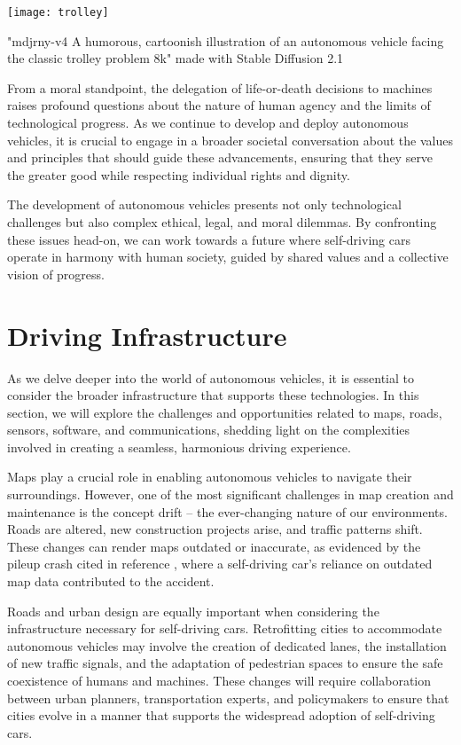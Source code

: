 \begin{pdf}
\begin{marginfigure}[-5.5cm]
        \texttt{[image: trolley]}
        \caption{"mdjrny-v4 A humorous, cartoonish illustration of an autonomous vehicle facing the classic trolley problem 8k" made with Stable Diffusion 2.1}
\end{marginfigure}
\begin{pdf}

From a moral standpoint, the delegation of life-or-death decisions to machines raises profound questions about the nature of human agency and the limits of technological progress. As we continue to develop and deploy autonomous vehicles, it is crucial to engage in a broader societal conversation about the values and principles that should guide these advancements, ensuring that they serve the greater good while respecting individual rights and dignity.

The development of autonomous vehicles presents not only technological challenges but also complex ethical, legal, and moral dilemmas. By confronting these issues head-on, we can work towards a future where self-driving cars operate in harmony with human society, guided by shared values and a collective vision of progress.

\section{Driving Infrastructure}

As we delve deeper into the world of autonomous vehicles, it is essential to consider the broader infrastructure that supports these technologies. In this section, we will explore the challenges and opportunities related to maps, roads, sensors, software, and communications, shedding light on the complexities involved in creating a seamless, harmonious driving experience.

Maps play a crucial role in enabling autonomous vehicles to navigate their surroundings. However, one of the most significant challenges in map creation and maintenance is the concept drift – the ever-changing nature of our environments. Roads are altered, new construction projects arise, and traffic patterns shift. These changes can render maps outdated or inaccurate, as evidenced by the pileup crash cited in reference , where a self-driving car's reliance on outdated map data contributed to the accident.

Roads and urban design are equally important when considering the infrastructure necessary for self-driving cars. Retrofitting cities to accommodate autonomous vehicles may involve the creation of dedicated lanes, the installation of new traffic signals, and the adaptation of pedestrian spaces to ensure the safe coexistence of humans and machines. These changes will require collaboration between urban planners, transportation experts, and policymakers to ensure that cities evolve in a manner that supports the widespread adoption of self-driving cars.


\end{pdf}
\end{pdf}
